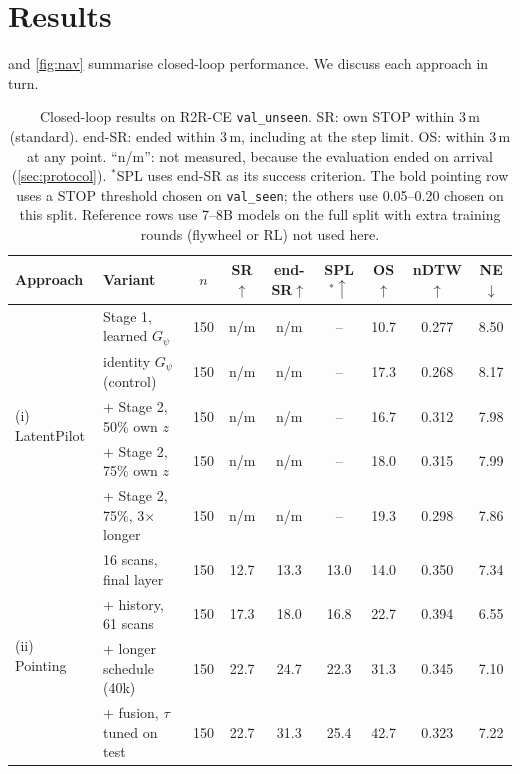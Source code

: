 \documentclass[11pt]{article}
\newcommand{\na}{--}
\begin{document}
\section{Results}

 and \cref{fig:nav} summarise closed-loop performance. We discuss each approach in turn.

\begin{table}[t]
\centering\footnotesize
\caption{Closed-loop results on R2R-CE \texttt{val\_unseen}. SR: own STOP within 3\,m (standard). end-SR: ended within
3\,m, including at the step limit. OS: within 3\,m at any point. ``n/m'': not measured, because the evaluation ended on
arrival (\cref{sec:protocol}). $^*$SPL uses end-SR as its success criterion. The bold pointing row uses a STOP threshold chosen on
\texttt{val\_seen}; the others use 0.05--0.20 chosen on this split. Reference rows use 7--8B models on the full
split with extra training rounds (flywheel or RL) not used here.}
\label{tab:main}
\setlength{\tabcolsep}{3.6pt}
\begin{tabular}{llccccccc}
\toprule
Approach & Variant & $n$ & SR$\uparrow$ & end-SR$\uparrow$ & SPL$^*\uparrow$ & OS$\uparrow$ & nDTW$\uparrow$ & NE$\downarrow$ \\
\midrule
\multirow{5}{*}{(i) LatentPilot} & Stage 1, learned $G_\psi$ & 150 & n/m & n/m & \na & 10.7 & 0.277 & 8.50 \\
 & identity $G_\psi$ (control) & 150 & n/m & n/m & \na & 17.3 & 0.268 & 8.17 \\
 & + Stage 2, 50\% own $z$ & 150 & n/m & n/m & \na & 16.7 & 0.312 & 7.98 \\
 & + Stage 2, 75\% own $z$ & 150 & n/m & n/m & \na & 18.0 & 0.315 & 7.99 \\
 & + Stage 2, 75\%, 3$\times$ longer & 150 & n/m & n/m & \na & 19.3 & 0.298 & 7.86 \\
\midrule
\multirow{5}{*}{(ii) Pointing} & 16 scans, final layer & 150 & 12.7 & 13.3 & 13.0 & 14.0 & 0.350 & 7.34 \\
 & + history, 61 scans & 150 & 17.3 & 18.0 & 16.8 & 22.7 & 0.394 & 6.55 \\
 & + longer schedule (40k) & 150 & 22.7 & 24.7 & 22.3 & 31.3 & 0.345 & 7.10 \\
 & + fusion, $\tau$ tuned on test & 150 & 22.7 & 31.3 & 25.4 & 42.7 & 0.323 & 7.22 \\

\end{tabular}
\end{table}
\end{document}
